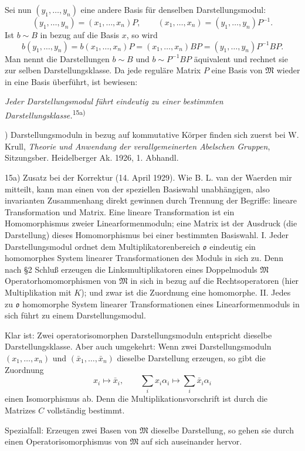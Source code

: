 \documentclass[11pt]{article}
\providecommand{\mM}{\mathfrak{M}}
\providecommand{\mo}{\mathfrak{o}}
\begin{document}
Sei nun $(y_1,\ldots,y_n)$ eine andere Basis für denselben Darstellungsmodul:
\[
        (y_1,\ldots,y_n)=(x_1,\ldots,x_n)P,
        \qquad
        (x_1,\ldots,x_n)=(y_1,\ldots,y_n)P^{-1}.
\]
Ist $b\sim B$ in bezug auf die Basis $x$, so wird
\[
        b(y_1,\ldots,y_n)=b(x_1,\ldots,x_n)P
        =(x_1,\ldots,x_n)BP
        =(y_1,\ldots,y_n)P^{-1}BP.
\]
Man nennt die Darstellungen $b\sim B$ und $b\sim P^{-1}BP$ äquivalent und rechnet sie zur selben Darstellungsklasse. Da jede reguläre Matrix $P$ eine Basis von $\mM$ wieder in eine Basis überführt, ist bewiesen:

\emph{Jeder Darstellungsmodul führt eindeutig zu einer bestimmten Darstellungsklasse.}\textsuperscript{15a)}

{\footnotesize{}) Darstellungsmoduln in bezug auf kommutative Körper finden sich zuerst bei W. Krull, \emph{Theorie und Anwendung der verallgemeinerten Abelschen Gruppen}, Sitzungsber. Heidelberger Ak. 1926, 1. Abhandl.\par
15a) Zusatz bei der Korrektur (14. April 1929). Wie B. L. van der Waerden mir mitteilt, kann man einen von der speziellen Basiswahl unabhängigen, also invarianten Zusammenhang direkt gewinnen durch Trennung der Begriffe: lineare Transformation und Matrix. Eine lineare Transformation ist ein Homomorphismus zweier Linearformenmoduln; eine Matrix ist der Ausdruck (die Darstellung) dieses Homomorphismus bei einer bestimmten Basiswahl. I. Jeder Darstellungsmodul ordnet dem Multiplikatorenbereich $\mo$ eindeutig ein homomorphes System linearer Transformationen des Moduls in sich zu. Denn nach §2 Schluß erzeugen die Linksmultiplikatoren eines Doppelmoduls $\mM$ Operatorhomomorphismen von $\mM$ in sich in bezug auf die Rechtsoperatoren (hier Multiplikation mit $K$); und zwar ist die Zuordnung eine homomorphe. II. Jedes zu $\mo$ homomorphe System linearer Transformationen eines Linearformenmoduls in sich führt zu einem Darstellungsmodul.\par}

Klar ist: Zwei operatorisomorphen Darstellungsmoduln entspricht dieselbe Darstellungsklasse. Aber auch umgekehrt: Wenn zwei Darstellungsmoduln $(x_1,\ldots,x_n)$ und $(\bar x_1,\ldots,\bar x_n)$ dieselbe Darstellung erzeugen, so gibt die Zuordnung
\[
        x_i\mapsto\bar x_i,
        \qquad
        \sum_i x_i\alpha_i\mapsto\sum_i\bar x_i\alpha_i
\]
einen Isomorphismus ab. Denn die Multiplikationsvorschrift ist durch die Matrizes $C$ vollständig bestimmt.

Spezialfall: Erzeugen zwei Basen von $\mM$ dieselbe Darstellung, so gehen sie durch einen Operatorisomorphismus von $\mM$ auf sich auseinander hervor.
\end{document}
